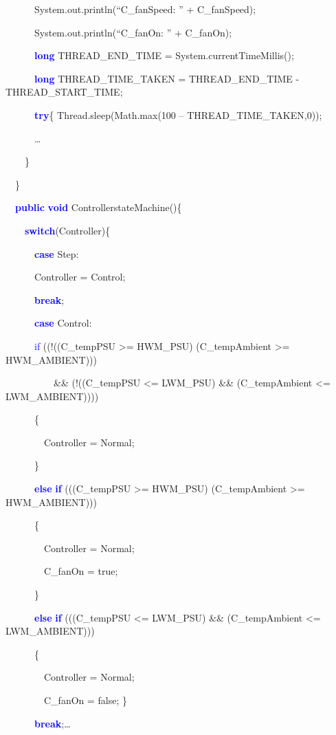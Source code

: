 \documentclass{llncs}%
\begin{document}
{\ttfamily
\ \ \ \ \ \ System.out.println(``C\_fanSpeed: '' + C\_fanSpeed);}

{\ttfamily
\ \ \ \ \ \ System.out.println(``C\_fanOn: '' + C\_fanOn);}

{\ttfamily
\ \ \ \ \ \ \textbf{\textcolor{blue}{long}} THREAD\_END\_TIME =
System.currentTimeMillis();}

{\ttfamily
\ \ \ \ \ \ \textbf{\textcolor{blue}{long}} THREAD\_TIME\_TAKEN =
THREAD\_END\_TIME - THREAD\_START\_TIME;}

{\ttfamily
\ \ \ \ \ \ \textbf{\textcolor{blue}{try}}\{ Thread.sleep(Math.max(100 -- THREAD\_TIME\_TAKEN,0));}

{\ttfamily
\ \ \ \ \ \ {\dots} }

{\ttfamily
\ \ \ \ \}}

{\ttfamily
\ \ \}}


\bigskip

{\ttfamily
\ \ \textbf{\textcolor{blue}{public}} \textbf{\textcolor{blue}{void}}
ControllerstateMachine()\{}

{\ttfamily
\ \ \ \ \textbf{\textcolor{blue}{switch}}(Controller)\{}

{\ttfamily
\ \ \ \ \ \ \textbf{\textcolor{blue}{case}} Step:}

{\ttfamily
\ \ \ \ \ \ Controller = Control;}

{\ttfamily
\ \ \ \ \ \ \textbf{\textcolor{blue}{break}};}

{\ttfamily
\ \ \ \ \ \ \textbf{\textcolor{blue}{case}} Control:}

{\ttfamily
\ \ \ \ \ \ \textcolor{blue}{if} ((!((C\_tempPSU {\textgreater}=
HWM\_PSU) {\textbar}{\textbar} (C\_tempAmbient {\textgreater}=
HWM\_AMBIENT))) }

{\ttfamily
\ \ \ \ \ \ \ \ \ \ \&\& (!((C\_tempPSU {\textless}= LWM\_PSU) \&\&
(C\_tempAmbient {\textless}= LWM\_AMBIENT))))}

{\ttfamily
\ \ \ \ \ \ \{}

{\ttfamily
\ \ \ \ \ \ \ \ Controller = Normal;}

{\ttfamily
\ \ \ \ \ \ \}}

{\ttfamily
\ \ \ \ \ \ \textbf{\textcolor{blue}{else}}
\textbf{\textcolor{blue}{if}} (((C\_tempPSU {\textgreater}= HWM\_PSU)
{\textbar}{\textbar} (C\_tempAmbient {\textgreater}= HWM\_AMBIENT)))}

{\ttfamily
\ \ \ \ \ \ \{}

{\ttfamily
\ \ \ \ \ \ \ \ Controller = Normal;}

{\ttfamily
\ \ \ \ \ \ \ \ C\_fanOn = true;}

{\ttfamily
\ \ \ \ \ \ \}}

{\ttfamily
\ \ \ \ \ \ \textbf{\textcolor{blue}{else}}
\textbf{\textcolor{blue}{if}} (((C\_tempPSU {\textless}= LWM\_PSU) \&\&
(C\_tempAmbient {\textless}= LWM\_AMBIENT)))}

{\ttfamily
\ \ \ \ \ \ \{}

{\ttfamily
\ \ \ \ \ \ \ \ Controller = Normal;}

{\ttfamily
\ \ \ \ \ \ \ \ C\_fanOn = false; \}}

{\ttfamily
\ \ \ \ \ \ \textbf{\textcolor{blue}{break}};}\dots
\end{document}
